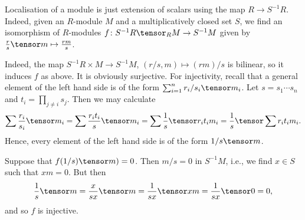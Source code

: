 Localisation of a module is just extension of scalars using the map
$R \to S^{-1}R$. Indeed, given an $R$-module $M$ and a multiplicatively
closed set $S$, we find an isomorphism of $R$-modules
$f\colon S^{-1}R\tensor_R M\to S^{-1}M$ given by $\frac{r}{s}\tensor m\mapsto \frac{rm}{s}$.

Indeed, the map $S^{-1}R\times M\to S^{-1}M$, $(r/s, m)\mapsto (rm)/s$ is bilinear,
so it induces  $f$ as above. It is obviously surjective. For injectivity,
recall that a general element of the left hand side is of the form
$\sum_{i = 1}^n r_i/s_i \tensor m_i$. Let $s = s_1\cdots s_n$ and
$t_i = \prod_{j\neq i} s_j$. Then we may calculate
\[ \sum \frac{r_i}{s_i}\tensor m_i = \sum \frac{r_it_i}{s}\tensor m_i = \sum \frac{1}{s}\tensor r_it_im_i = \frac{1}{s}\tensor \sum r_it_im_i. \]
Hence, every element of the left hand side is of the form $1/s \tensor m$.

Suppose that $f(1/s)\tensor m) = 0$. Then $m/s = 0$ in $S^{-1} M$, i.e., we find
 $x \in S$ such that $xm = 0$. But then
 \[ \frac{1}{s}\tensor m = \frac{x}{sx}\tensor m = \frac{1}{sx}\tensor xm = \frac{1}{sx}\tensor 0 = 0, \]
 and so $f$ is injective.
